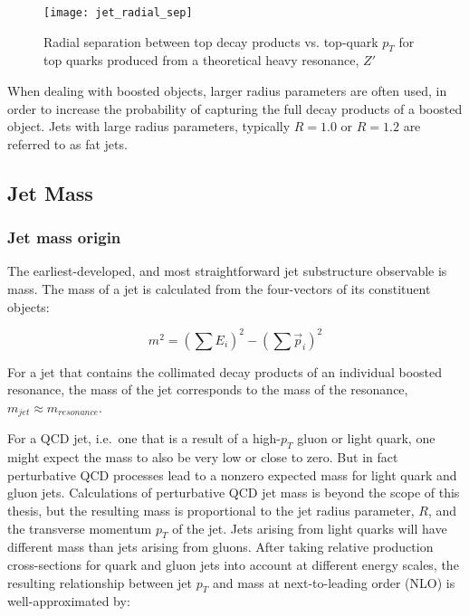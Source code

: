 \begin{figure}[h!]
    \centering
\texttt{[image: jet\_radial\_sep]}
\caption{Radial separation between top decay products vs. top-quark $p_T$ for top quarks produced from a theoretical heavy resonance, $Z'$}
\label{fig:jet_radial_sep}
\end{figure}

When dealing with boosted objects, larger radius parameters are often used, in order to increase the probability
of capturing the full decay products of a boosted object.
Jets with large radius parameters, typically $R=1.0$ or $R=1.2$ are referred to as fat jets.

\subsection{Jet Mass}\label{subsec:jet_mass}

\subsubsection{Jet mass origin}

The earliest-developed, and most straightforward jet substructure observable is mass.
The mass of a jet is calculated from the four-vectors of its constituent objects:

\begin{equation}\label{eq:jet_mass}
    m^2 = \left(\sum E_i\right)^2 - \left(\sum \vec{p}_i \right)^2
\end{equation}

For a jet that contains the collimated decay products of an individual boosted resonance,
the mass of the jet corresponds to the mass of the resonance, $m_{jet} \approx m_{resonance}$.

For a QCD jet, i.e.\ one that is a result of a high-$p_T$ gluon or light quark, one might expect the mass to also be very low or close to zero.
But in fact perturbative QCD processes lead to a nonzero expected mass for light quark and gluon jets.
Calculations of perturbative QCD jet mass is beyond the scope of this thesis,
but the resulting mass is proportional to the jet radius parameter, $R$, and the transverse momentum $p_T$ of the jet.
Jets arising from light quarks will have different mass than jets arising from gluons.
After taking relative production cross-sections for quark and gluon jets into account at different energy scales,
the resulting relationship between jet $p_T$ and mass at next-to-leading order (NLO) is well-approximated by:

